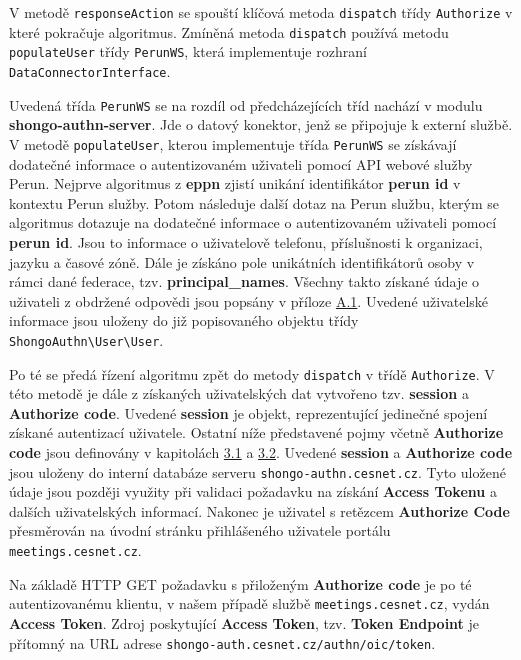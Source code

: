 \documentclass[
  printed, %
  twoside, %
  table,   %
  nolof,     %
  nolot,     %
]{fithesis3}
\begin{document}
\label{sec:responseAction}
V metodě \texttt{responseAction} se spouští klíčová metoda \texttt{dispatch} třídy \texttt{Authorize} v které pokračuje algoritmus. Zmíněná metoda \texttt{dispatch} používá metodu \texttt{populateUser} třídy \texttt{PerunWS}, která implementuje rozhraní \texttt{DataConnectorInterface}. \par

Uvedená třída \texttt{PerunWS} se na rozdíl od předcházejících tříd nachází v modulu \textbf{shongo-authn-server}. Jde o datový konektor, jenž se připojuje k externí službě. V metodě \texttt{populateUser}, kterou implementuje třída \texttt{PerunWS} se získávají dodatečné informace o autentizovaném uživateli pomocí API webové služby Perun. Nejprve algoritmus z \textbf{eppn} zjistí unikání identifikátor \textbf{perun id} v kontextu Perun služby. Potom následuje další dotaz na Perun službu, kterým se algoritmus dotazuje na dodatečné informace o autentizovaném uživateli pomocí \textbf{perun id}. Jsou to informace o uživatelově telefonu, příslušnosti k organizaci, jazyku a časové zóně. Dále je získáno pole unikátních identifikátorů osoby v rámci dané federace, tzv. \textbf{principal\_names}. Všechny takto získané údaje o uživateli z obdržené odpovědi jsou popsány v příloze \hyperref[table:perunws:user]{A.1}. Uvedené uživatelské informace jsou uloženy do již popisovaného objektu třídy \texttt{ShongoAuthn\textbackslash User\textbackslash User}. \par

Po té se předá řízení algoritmu zpět do metody \texttt{dispatch} v třídě \texttt{Authorize}. V této metodě je dále z získaných uživatelských dat vytvořeno tzv. \textbf{session} a \textbf{Authorize code}. Uvedené \textbf{session} je objekt, reprezentující jedinečné spojení získané autentizací uživatele. Ostatní níže představené pojmy včetně \textbf{Authorize code} jsou definovány v kapitolách \hyperref[sec:oauth]{3.1} a \hyperref[sec:oidc]{3.2}. Uvedené \textbf{session} a \textbf{Authorize code} jsou uloženy do interní databáze serveru \texttt{shongo-authn.cesnet.cz}. Tyto uložené údaje jsou později využity při validaci požadavku na získání \textbf{Access Tokenu} a dalších uživatelských informací. Nakonec je uživatel s retězcem \textbf{Authorize Code} přesměrován na úvodní stránku přihlášeného uživatele portálu \texttt{meetings.cesnet.cz}. \par

Na základě HTTP GET požadavku s přiloženým \textbf{Authorize code} je po té autentizovanému klientu, v našem případě službě \texttt{meetings.cesnet.cz}, vydán  \textbf{Access Token}. Zdroj poskytující \textbf{Access Token}, tzv. \textbf{Token Endpoint} je přítomný na URL adrese \texttt{shongo-auth.cesnet.cz/authn/oic/token}. \par 
\end{document}
